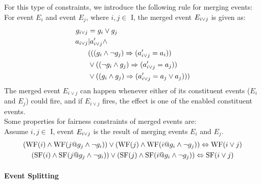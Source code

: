 For this type of constraints, we introduce the following rule for
merging events: For event $E_{i}$ and event $E_{j}$, where $i,j \in$
I, the merged event $E_{i\vee j}$ is given as:
\begin{align*}
g_{i\vee {j}} & =  g_i\vee g_j\\
a_{i\vee {j}} & |  a'_{i\vee j} \wedge \\
           &    (((g_i\wedge\neg g_j)\Rightarrow (a'_{i\vee j} = a_i))\\
           &    \vee ((\neg g_i\wedge g_j)\Rightarrow (a'_{i\vee j} = a_j))\\
           &    \vee ((g_i\wedge g_j)\Rightarrow (a'_{i\vee j} = a_j\vee a_j)))
\end{align*}
The merged event $E_{i\lor{j}}$ can happen whenever either of its constituent events ($E_i$ and $E_j$) could fire, and if $E_{i\lor{j}}$ fires, the effect is one of the enabled constituent events.\\
Some properties for fairness constraints of merged events are:\\
Assume $i,j \in$ I, event $E_{i\vee j}$ is the result of merging events $E_i$ and $E_j$.
\begin{gather*} 
  (\mathrm{WF}(i)\wedge\mathrm{WF}(j@g_{j}\wedge\neg{g}_{i}))\vee(\mathrm{WF}(j)\wedge\mathrm{WF}(i@g_{i}\wedge\neg{g}_{j})) \Leftrightarrow\mathrm{WF}(i\vee{j})\\
  (\mathrm{SF}(i)\wedge\mathrm{SF}(j@g_{j}\wedge\neg{g}_{i}))\vee(\mathrm{SF}(j)\wedge\mathrm{SF}(i@g_{i}\wedge\neg{g}_{j})) \Leftrightarrow\mathrm{SF}(i\vee{j})
\end{gather*}

\paragraph{Event Splitting}

